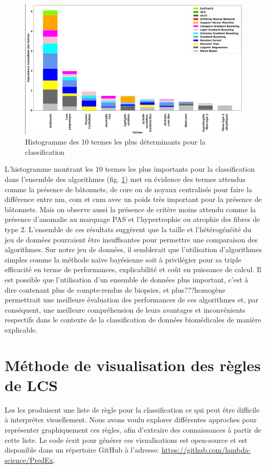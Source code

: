 \begin{figure}[htbp]
  \centering
  \includegraphics[width=1\textwidth]{figures/feature_importance.png}
  \caption[Histogramme des 10 termes les plus déterminants pour la classification]{Histogramme des 10 termes les plus déterminants pour la classification}
  \label{fig:feautre_importance}
\end{figure}
L'histogramme montrant les 10 termes les plus importants pour la classification dans l'ensemble des algorithmes (fig. \ref{fig:feautre_importance}) met en évidence des termes attendus comme la présence de bâtonnets, de core ou de noyaux centralisés pour faire la différence entre \gls{nm}, \gls{com} et \gls{cnm} avec un poids très important pour la présence de bâtonnets. Mais on observe aussi la présence de critère moins attendu comme la présence d'anomalie au marquage PAS et l'hypertrophie ou atrophie des fibres de type 2.
L'ensemble de ces résultats suggèrent que la taille et l'hétérogénéité du jeu de données pourraient être insuffisantes pour permettre une comparaison des algorithmes. Sur notre jeu de données, il semblerait que l'utilisation d'algorithmes simples comme la méthode naïve bayésienne soit à privilégier pour sa triple efficacité en terme de performances, explicabilité et coût en puissance de calcul.  Il est possible que l'utilisation d'un ensemble de données plus important, c'est à dire contenant plus de compte-rendus de biopsies, et plus???homogène permettrait une meilleure évaluation des performances de ces algorithmes et, par conséquent, une meilleure compréhension de leurs avantages et inconvénients respectifs dans le contexte de la classification de données biomédicales de manière explicable.
\section{Méthode de visualisation des règles de LCS}
Les \gls{lcs} produisent une liste de règle pour la classification ce qui peut être difficile à interpréter visuellement. Nous avons voulu explorer différentes approches pour représenter graphiquement ces règles, afin d'extraire des connaissances à partir de cette liste. Le code écrit pour générer ces visualisations est open-source et est disponible dans un répertoire GitHub à l'adresse: \href{https://github.com/lambda-science/PredEx}{https://github.com/lambda-science/PredEx}.
